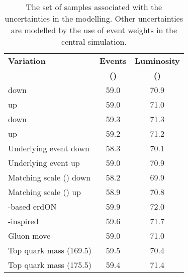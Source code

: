 \begin{table}
	\centering
		\caption{The set of samples associated with the uncertainties in the \powhegpythia{} modelling. Other uncertainties are modelled by the use of event weights in the central \powhegpythia{} simulation.}
		\label{tb:GenSys}
		\begin{tabular}{lcc}
			\textbf{Variation}	& \textbf{Events}	& \textbf{Luminosity} \\
								& \textbf{(\ten{6})}	& \textbf{(\fbinv{})} \\
			\hline
			\ISR{} down						& 59.0 & 70.9 \\
			\ISR{} up						& 59.0 & 71.0 \\ 
			\FSR{} down						& 59.3 & 71.3 \\
			\FSR{} up						& 59.2 & 71.2 \\ 
			Underlying event down			& 58.3 & 70.1 \\ 
			Underlying event up				& 59.0 & 70.9 \\ 
			Matching scale (\hdamp{}) down	& 58.2 & 69.9 \\
			Matching scale (\hdamp{}) up	& 58.9 & 70.8 \\ 
			\CR{} \MPI{}-based erdON 		& 59.9 & 72.0 \\ 
			\CR{} \QCD{}-inspired 			& 59.6 & 71.7 \\ 
			\CR{} Gluon move 				& 59.0 & 71.0 \\ 
			Top quark mass (169.5\GeV{})	& 59.5 & 70.4 \\
			Top quark mass (175.5\GeV{})	& 59.4 & 71.4 \\
		\end{tabular}%
\end{table}

